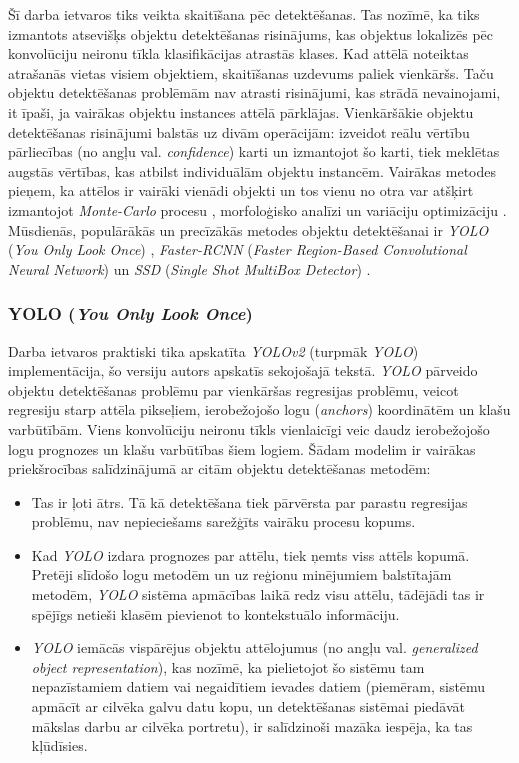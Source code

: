 Šī darba ietvaros tiks veikta skaitīšana pēc detektēšanas. Tas nozīmē, ka tiks izmantots atsevišķs objektu detektēšanas risinājums, kas objektus lokalizēs pēc konvolūciju neironu tīkla klasifikācijas atrastās klases. Kad attēlā noteiktas atrašanās vietas visiem objektiem, skaitīšanas uzdevums paliek vienkāršs. Taču objektu detektēšanas problēmām nav atrasti risinājumi, kas strādā nevainojami, it īpaši, ja vairākas objektu instances attēlā pārklājas. Vienkāršākie objektu detektēšanas risinājumi balstās uz divām operācijām: izveidot reālu vērtību pārliecības (no angļu val. \textit{confidence}) karti un izmantojot šo karti, tiek meklētas augstās vērtības, kas atbilst individuālām objektu instancēm. Vairākas metodes pieņem, ka attēlos ir vairāki vienādi objekti un tos vienu no otra var atšķirt izmantojot \textit{Monte-Carlo} procesu \cite{descombes2009object}, morfoloģisko analīzi \cite{selinummi2005software} un variāciju optimizāciju \cite{nath2006cell}. Mūsdienās, populārākās un precīzākās metodes objektu detektēšanai ir \textit{YOLO} (\textit{You Only Look Once}) \cite{redmon2016you}, \textit{Faster-RCNN} (\textit{Faster Region-Based Convolutional Neural Network}) \cite{ren2015faster} un \textit{SSD} (\textit{Single Shot MultiBox Detector}) \cite{liu2016ssd}.
\subsubsection{YOLO (\textit{You Only Look Once})}
Darba ietvaros praktiski tika apskatīta \textit{YOLOv2} (turpmāk \textit{YOLO}) implementācija, šo versiju autors apskatīs sekojošajā tekstā. \textit{YOLO} pārveido objektu detektēšanas problēmu par vienkāršas regresijas problēmu, veicot regresiju starp attēla pikseļiem, ierobežojošo logu (\textit{anchors}) koordinātēm un klašu varbūtībām. Viens konvolūciju neironu tīkls vienlaicīgi veic daudz ierobežojošo logu prognozes un klašu varbūtības šiem logiem. Šādam modelim ir vairākas priekšrocības salīdzinājumā ar citām objektu detektēšanas metodēm: 
\begin{itemize}
	\item Tas ir ļoti ātrs. Tā kā detektēšana tiek pārvērsta par parastu regresijas problēmu, nav nepieciešams sarežģīts vairāku procesu kopums. 
	\item Kad \textit{YOLO} izdara prognozes par attēlu, tiek ņemts viss attēls kopumā. Pretēji slīdošo logu metodēm un uz reģionu minējumiem balstītajām metodēm, \textit{YOLO} sistēma apmācības laikā redz visu attēlu, tādējādi tas ir spējīgs netieši klasēm pievienot to kontekstuālo informāciju.
	\item \textit{YOLO} iemācās vispārējus objektu attēlojumus (no angļu val. \textit{generalized object representation}), kas nozīmē, ka pielietojot šo sistēmu tam nepazīstamiem datiem vai negaidītiem ievades datiem (piemēram, sistēmu apmācīt ar cilvēka galvu datu kopu, un detektēšanas sistēmai piedāvāt mākslas darbu ar cilvēka portretu), ir salīdzinoši mazāka iespēja, ka tas kļūdīsies. 
\end{itemize}

